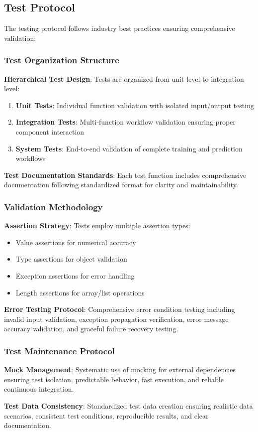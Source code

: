 \subsection{Test Protocol}

The testing protocol follows industry best practices ensuring comprehensive validation:

\subsubsection{Test Organization Structure}

\textbf{Hierarchical Test Design}: Tests are organized from unit level to integration level:
\begin{enumerate}
	\item \textbf{Unit Tests}: Individual function validation with isolated input/output testing
	\item \textbf{Integration Tests}: Multi-function workflow validation ensuring proper component interaction
	\item \textbf{System Tests}: End-to-end validation of complete training and prediction workflows
\end{enumerate}

\textbf{Test Documentation Standards}: Each test function includes comprehensive documentation following standardized format for clarity and maintainability.

\subsubsection{Validation Methodology}

\textbf{Assertion Strategy}: Tests employ multiple assertion types:
\begin{itemize}
	\item Value assertions for numerical accuracy
	\item Type assertions for object validation
	\item Exception assertions for error handling
	\item Length assertions for array/list operations
\end{itemize}

\textbf{Error Testing Protocol}: Comprehensive error condition testing including invalid input validation, exception propagation verification, error message accuracy validation, and graceful failure recovery testing.

\subsubsection{Test Maintenance Protocol}

\textbf{Mock Management}: Systematic use of mocking for external dependencies ensuring test isolation, predictable behavior, fast execution, and reliable continuous integration.

\textbf{Test Data Consistency}: Standardized test data creation ensuring realistic data scenarios, consistent test conditions, reproducible results, and clear documentation.
